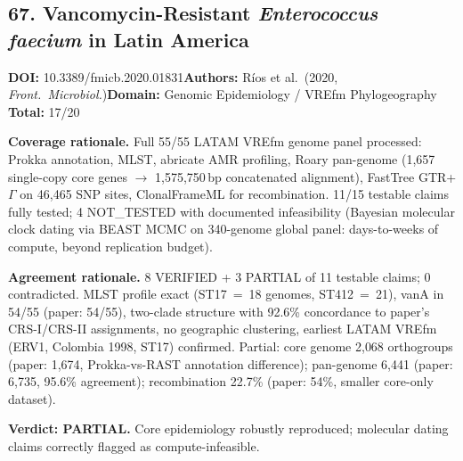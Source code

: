 \subsection{67. Vancomycin-Resistant \textit{Enterococcus faecium} in Latin America}
\textbf{DOI:} 10.3389/fmicb.2020.01831\quad\textbf{Authors:} R\'{i}os et al.\ (2020, \textit{Front.\ Microbiol.})\quad\textbf{Domain:} Genomic Epidemiology / VREfm Phylogeography\\
\quad{}\quad\textbf{Total:} 17/20\par\smallskip
\noindent\textbf{Coverage rationale.} Full 55/55 LATAM VREfm genome panel processed: Prokka annotation, MLST, abricate AMR profiling, Roary pan-genome (1{,}657 single-copy core genes $\to$ 1{,}575{,}750\,bp concatenated alignment), FastTree GTR+$\Gamma$ on 46{,}465 SNP sites, ClonalFrameML for recombination. 11/15 testable claims fully tested; 4 NOT\_TESTED with documented infeasibility (Bayesian molecular clock dating via BEAST MCMC on 340-genome global panel: days-to-weeks of compute, beyond replication budget).\par
\noindent\textbf{Agreement rationale.} 8 VERIFIED + 3 PARTIAL of 11 testable claims; 0 contradicted. MLST profile exact (ST17~=~18 genomes, ST412~=~21), vanA in 54/55 (paper: 54/55), two-clade structure with 92.6\% concordance to paper's CRS-I/CRS-II assignments, no geographic clustering, earliest LATAM VREfm (ERV1, Colombia 1998, ST17) confirmed. Partial: core genome 2{,}068 orthogroups (paper: 1{,}674, Prokka-vs-RAST annotation difference); pan-genome 6{,}441 (paper: 6{,}735, 95.6\% agreement); recombination 22.7\% (paper: 54\%, smaller core-only dataset).\par\smallskip
\noindent\textbf{Verdict: PARTIAL.} Core epidemiology robustly reproduced; molecular dating claims correctly flagged as compute-infeasible.
